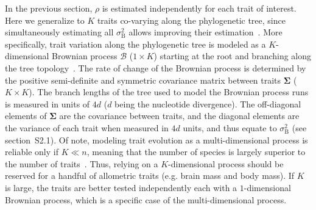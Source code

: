 \documentclass{article}
\newcommand{\UniDimArray}[1]{\bm{#1}}
\newcommand{\BiDimArray}[1]{\bm{#1}}
\newcommand{\NbrTaxa}{n}
\newcommand{\RateBetween}{\sigma^2_{\mathrm{B}}}
\newcommand{\NI}{\rho}
\newcommand{\Ntrait}{K}
\newcommand{\Covariancematrix}{\Sigma}
\newcommand{\CovarianceMatrix}{\BiDimArray{\Covariancematrix}}
\newcommand{\brownian}{\mathcal{B}}
\newcommand{\Brownian}{\UniDimArray{\brownian}}
\begin{document}
In the previous section, $\NI$ is estimated independently for each trait of interest.
Here we generalize to $\Ntrait$ traits co-varying along the phylogenetic tree, since simultaneously estimating all $\RateBetween$ allows improving their estimation~\citep{adams_multivariate_2018}.
More specifically, trait variation along the phylogenetic tree is modeled as a $\Ntrait$-dimensional Brownian process $\Brownian$ ($1 \times \Ntrait$) starting at the root and branching along the tree topology~\citep{huelsenbeck_detecting_2003, lartillot_phylogenetic_2011, lartillot_joint_2012, latrille_inferring_2021}.
The rate of change of the Brownian process is determined by the positive semi-definite and symmetric covariance matrix between traits $\CovarianceMatrix$ ($\Ntrait \times \Ntrait$).
The branch lengths of the tree used to model the Brownian process runs is measured in units of $4d$ ($d$ being the nucleotide divergence).
The off-diagonal elements of $\CovarianceMatrix$ are the covariance between traits, and the diagonal elements are the variance of each trait when measured in $4d$ units, and thus equate to $\RateBetween$ (see section~S2.1).
Of note, modeling trait evolution as a multi-dimensional process is reliable only if $\Ntrait \ll \NbrTaxa$, meaning that the number of species is largely superior to the number of traits~\citep{adams_multivariate_2018}.
Thus, relying on a $\Ntrait$-dimensional process should be reserved for a handful of allometric traits (e.g. brain mass and body mass).
If $\Ntrait$ is large, the traits are better tested independently each with a $1$-dimensional Brownian process, which is a specific case of the multi-dimensional process.
\end{document}
